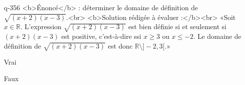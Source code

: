 \begin{truefalse}{q-356}
<b>Énoncé</b> : déterminer le domaine de définition de $\sqrt{(x+2)(x-3)}$.<br> <b>Solution rédigée à évaluer :</b><br>  «Soit $x\in\mathbb{R}$.  L'expression $\sqrt{(x+2)(x-3)}$ est bien définie si et seulement si $(x+2)(x-3)$ est positive, c'est-à-dire ssi $x\geq 3$ ou $x\leq -2$. Le domaine de définition de $\sqrt{(x+2)(x-3)}$ est donc $\mathbb{R}\setminus ]-2,3[$.»
\item* Vrai
\item Faux
\end{truefalse}

